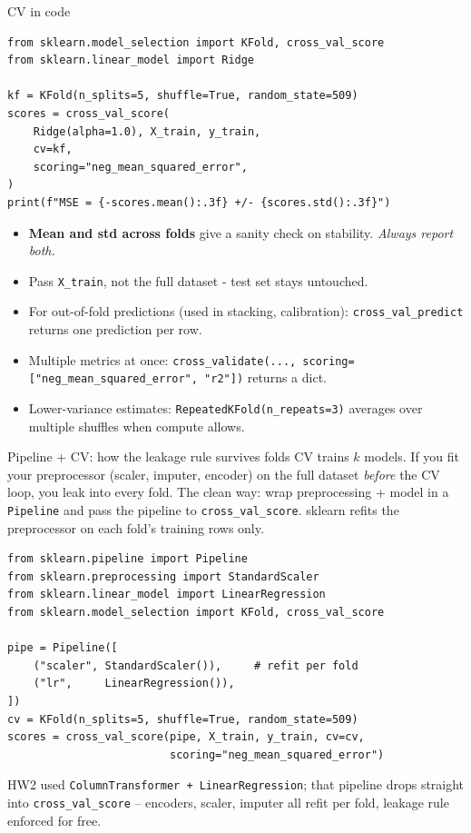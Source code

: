 \documentclass[aspectratio=169]{beamer}
\begin{document}
\begin{frame}[fragile]{CV in code}
  \vskip 4pt
\begin{lstlisting}
from sklearn.model_selection import KFold, cross_val_score
from sklearn.linear_model import Ridge

kf = KFold(n_splits=5, shuffle=True, random_state=509)
scores = cross_val_score(
    Ridge(alpha=1.0), X_train, y_train,
    cv=kf,
    scoring="neg_mean_squared_error",
)
print(f"MSE = {-scores.mean():.3f} +/- {scores.std():.3f}")
\end{lstlisting}
  \vfill
  \begin{itemize}\small
    \item \textbf{Mean and std across folds} give a sanity check on stability. \emph{Always report both.}
    \item Pass \texttt{X\_train}, not the full dataset - test set stays untouched.
    \item For out-of-fold predictions (used in stacking, calibration): \texttt{cross\_val\_predict} returns one prediction per row.
    \item Multiple metrics at once: \texttt{cross\_validate(...,~scoring=["neg\_mean\_squared\_error",~"r2"])} returns a dict.
    \item Lower-variance estimates: \texttt{RepeatedKFold(n\_repeats=3)} averages over multiple shuffles when compute allows.
  \end{itemize}
\end{frame}

\begin{frame}[fragile]{Pipeline + CV: how the leakage rule survives folds}
  CV trains $k$ models. If you fit your preprocessor (scaler, imputer, encoder) on the full dataset \emph{before} the CV loop, you leak into every fold. The clean way: wrap preprocessing + model in a \texttt{Pipeline} and pass the pipeline to \texttt{cross\_val\_score}. sklearn refits the preprocessor on each fold's training rows only.
{\lstset{basicstyle=\ttfamily\scriptsize}
\begin{lstlisting}
from sklearn.pipeline import Pipeline
from sklearn.preprocessing import StandardScaler
from sklearn.linear_model import LinearRegression
from sklearn.model_selection import KFold, cross_val_score

pipe = Pipeline([
    ("scaler", StandardScaler()),     # refit per fold
    ("lr",     LinearRegression()),
])
cv = KFold(n_splits=5, shuffle=True, random_state=509)
scores = cross_val_score(pipe, X_train, y_train, cv=cv,
                         scoring="neg_mean_squared_error")
\end{lstlisting}}
  \vfill
  \footnotesize HW2 used \texttt{ColumnTransformer + LinearRegression}; that pipeline drops straight into \texttt{cross\_val\_score} -- encoders, scaler, imputer all refit per fold, leakage rule enforced for free.
\end{frame}
\end{document}
